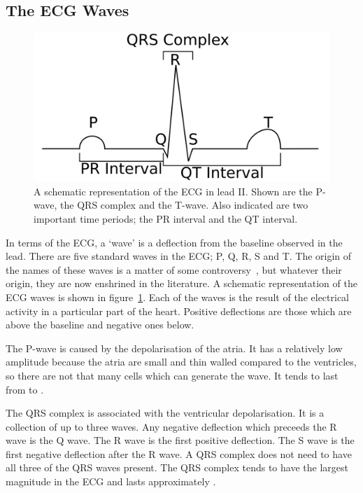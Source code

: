 \subsection{The ECG Waves}

\begin{figure}
\begin{center}
\includegraphics{figures/intro/schematic_ecg}
\end{center}
\caption[Schematic ECG]{
\label{fig:intro:ecg:schematic}
A schematic representation of the ECG in lead II.
Shown are the P-wave, the QRS complex and the T-wave.
Also indicated are two important time periods; the PR interval and the QT
interval.
}
\end{figure}

In terms of the ECG, a `wave' is a deflection from the baseline observed in the
lead.
There are five standard waves in the ECG; P, Q, R, S and T.
The origin of the names of these waves is a matter of some
controversy~\cite{Hurst1998}, but whatever their origin, they are now enshrined
in the literature.
A schematic representation of the ECG waves is shown in
figure~\ref{fig:intro:ecg:schematic}.
Each of the waves is the result of the electrical activity in a particular part
of the heart.
Positive deflections are those which are above the baseline and negative ones
below.

The P-wave is caused by the depolarisation of the atria.
It has a relatively low amplitude because the atria are small and thin walled
compared to the ventricles, so there are not that many cells which can generate
the wave.
It tends to last from  to .

The QRS complex is associated with the ventricular depolarisation.
It is a collection of up to three waves.
Any negative deflection which preceeds the R wave is the Q wave.
The R wave is the first positive deflection.
The S wave is the first negative deflection after the R wave.
A QRS complex does not need to have all three of the QRS waves present.
The QRS complex tends to have the largest magnitude in the ECG and lasts
approximately .

